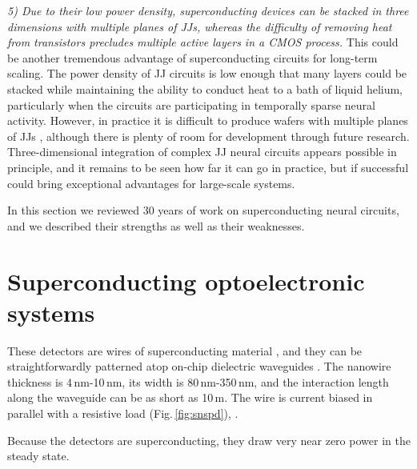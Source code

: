 \documentclass[twocolumn]{article}
\begin{document}
\vspace{1em}
\textit{5) Due to their low power density, superconducting devices can be stacked in three dimensions with multiple planes of JJs, whereas the difficulty of removing heat from transistors precludes multiple active layers in a CMOS process.} \newline This could be another tremendous advantage of superconducting circuits for long-term scaling. The power density of JJ circuits is low enough that many layers could be stacked while maintaining the ability to conduct heat to a bath of liquid helium, particularly when the circuits are participating in temporally sparse neural activity. However, in practice it is difficult to produce wafers with multiple planes of JJs \cite{to2016}, although there is plenty of room for development through future research. Three-dimensional integration of complex JJ neural circuits appears possible in principle, and it remains to be seen how far it can go in practice, but if successful could bring exceptional advantages for large-scale systems.

\vspace{1em}
In this section we reviewed 30 years of work on superconducting neural circuits, and we described their strengths as well as their weaknesses. 

\section{\label{sec:superconductingOptoelectronic}Superconducting optoelectronic systems}


These detectors are wires of superconducting material \cite{mave2013}, and they can be straightforwardly patterned atop on-chip dielectric waveguides \cite{shbu2017b,x,y,z}. The nanowire thickness is 4\,nm-10\,nm, its width is 80\,nm-350\,nm, and the interaction length along the waveguide can be as short as 10\,\textmu m. The wire is current biased in parallel with a resistive load (Fig.\,\ref{fig:snspd}), .

Because the detectors are superconducting, they draw very near zero power in the steady state. 
\end{document}
